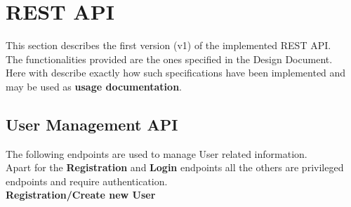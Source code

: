 \section{REST API}
\label{rest}
This section describes the first version (v1) of the implemented REST API.\\
The functionalities provided are the ones specified in the Design Document.\\
Here with describe exactly how such specifications have been implemented and may be used as \textbf{usage documentation}.

\subsection{User Management API}
The following endpoints are used to manage User related information.\\
Apart for the \textbf{Registration} and \textbf{Login} endpoints all the others are privileged endpoints and require authentication.\\

\textbf{Registration/Create new User}

